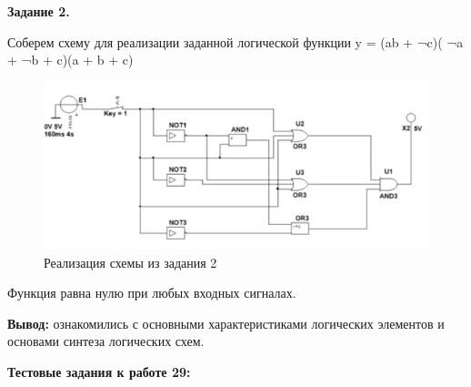 \documentclass[spec, och, labwork]{shiza}
\begin{document}
\textbf{Задание 2.}

Соберем схему для реализации заданной логической функции y = (ab + ¬c)( ¬a + ¬b + c)(a + b + c)

    \begin{figure}[H]
        \centering      %
        \includegraphics[width=1.\textwidth]{3}
        \caption{Реализация схемы из задания 2}
        \label{fig:image1}
    \end{figure}

Функция равна нулю при любых входных сигналах.

\textbf{Вывод:} ознакомились с основными характеристиками логических элементов и основами синтеза логических схем.

\textbf{Тестовые задания к работе 29:}
\end{document}
